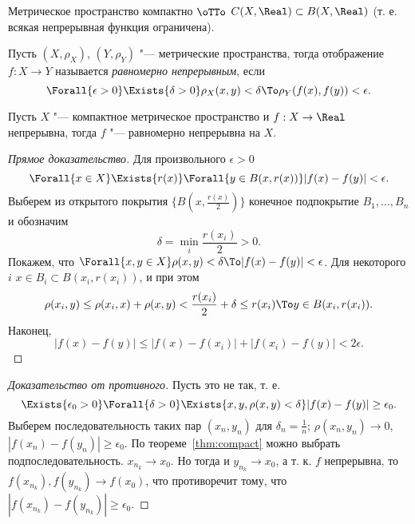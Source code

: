 \documentclass[main]{subfiles}
\begin{document}
\begin{exercise}
  Метрическое пространство компактно \( \oTTo \)
  \( C(X, \Real) \subset B(X, \Real) \)
  (т. е. всякая непрерывная функция ограничена).
\end{exercise}

\begin{definition}
  Пусть \( (X, \rho_X) \), \( (Y, \rho_Y) \) "---
  метрические пространства, тогда
  отображение \( f : X \to Y \) называется
  \emph{равномерно непрерывным}, если
  \[
    \Forall{\epsilon > 0}
    \Exists{\delta > 0}
    \rho_X(x, y) < \delta \To
    \rho_Y(f(x), f(y)) < \epsilon.
  \]
\end{definition}

\begin{theorem*}[Кантора]
  Пусть \( X \) "--- компактное метрическое пространство
  и \( f : X \to \Real \) непрерывна,
  тогда \( f \) "--- равномерно непрерывна на \( X \).
\end{theorem*}
\begin{proof}[Прямое доказательство]
  Для произвольного \( \epsilon > 0 \)
  \[
    \Forall {x \in X} \Exists{r(x)}
    \Forall{y \in B(x, r(x))}
    |f(x) - f(y)| < \epsilon.
  \]
  Выберем из открытого покрытия
  \( \{ B(x, \frac{r(x)}{2}) \} \) конечное
  подпокрытие \( B_1, \dots, B_n \)
  и обозначим \[ \delta = \min_i \frac{r(x_i)}{2} > 0. \]
  Покажем, что \( \Forall{x, y \in X} \rho(x, y) < \delta
  \To |f(x) - f(y)| < \epsilon \).
  Для некоторого \( i \) \( x \in B_i \subset B(x_i, r(x_i)) \),
  и при этом
  \[
    \rho(x_i, y) \le
    \rho(x_i, x) + \rho(x, y) <
    \frac{r(x_i)}{2} + \delta \le
    r(x_i) \To y \in B(x_i, r(x_i)).
  \]
  Наконец,
  \[
    |f(x) - f(y)| \le
    |f(x) - f(x_i)| + |f(x_i) - f(y)| <
    2 \epsilon.
  \]
\end{proof}
\begin{proof}[Доказательство от противного]
  Пусть это не так, т. е.
  \[
    \Exists{\epsilon_0 > 0}
    \Forall{\delta > 0}
    \Exists{x, y, \rho(x, y) < \delta}
    |f(x) - f(y)| \ge \epsilon_0.
  \]
  Выберем последовательность таких пар \( (x_n, y_n) \)
  для \( \delta_n = \frac{1}{n} \); \( \rho(x_n, y_n) \to 0 \),
  \( |f(x_n) - f(y_n)| \ge \epsilon_0 \).
  По теореме~\ref{thm:compact} можно выбрать подпоследовательность.
  \( x_{n_k} \to x_0 \). Но тогда и \( y_{n_k} \to x_0 \),
  а т. к. \( f \) непрерывна, то \( f(x_{n_k}), f(y_{n_k}) \to f(x_0) \),
  что противоречит тому, что
  \( |f(x_{n_k}) - f(y_{n_k})| \ge \epsilon_0 \).
\end{proof}
\end{document}
